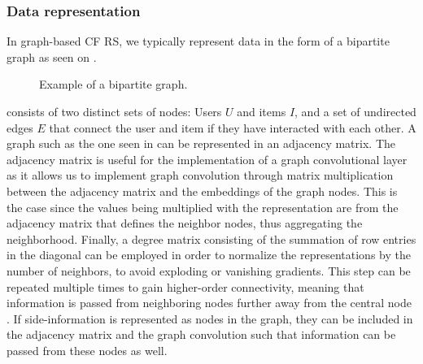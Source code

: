 \subsubsection*{Data representation}
In graph-based CF RS, we typically represent data in the form of a bipartite graph as seen on .
\begin{figure}[h]
\caption{Example of a bipartite graph.}
\label{fig:bipartite-graph}
\end{figure}
 consists of two distinct sets of nodes: Users $U$ and items $I$, and a set of undirected edges $E$ that connect the user and item if they have interacted with each other.
A graph such as the one seen in  can be represented in an adjacency matrix.
The adjacency matrix is useful for the implementation of a graph convolutional layer as it allows us to implement graph convolution through matrix multiplication between the adjacency matrix and the embeddings of the graph nodes.
This is the case since the values being multiplied with the representation are from the adjacency matrix that defines the neighbor nodes, thus aggregating the neighborhood.
Finally, a degree matrix consisting of the summation of row entries in the diagonal can be employed in order to normalize the representations by the number of neighbors, to avoid exploding or vanishing gradients.
This step can be repeated multiple times to gain higher-order connectivity, meaning that information is passed from neighboring nodes further away from the central node \cite{SimplifyingGCN, KOrderConnectivity}.
If side-information is represented as nodes in the graph, they can be included in the adjacency matrix and the graph convolution such that information can be passed from these nodes as well.
